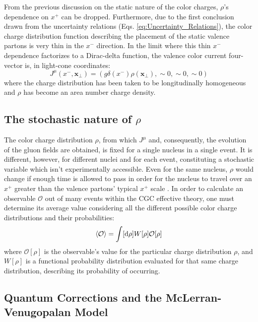 From the previous discussion on the static nature of the color charges, $\rho$'s dependence on $x^+$ can be dropped. Furthermore, due to the first conclusion drawn from the uncertainty relations (Eqs. \ref{eq:Uncertainty_Relations}), the color charge distribution function describing the placement of the static valence partons is very thin in the $x^-$ direction. In the limit where this thin $x^-$ dependence factorizes to a Dirac-delta function, the valence color current four-vector is, in light-cone coordinates:
\begin{equation}
	{J}^\mu (x^-,\mathbf{x}_\perp) = (g \delta (x^-) \rho (\mathbf{x}_\perp), \sim 0, \sim 0, \sim 0)
	\label{eq:+_Current}
\end{equation}
where the charge distribution has been taken to be longitudinally homogeneous and $\rho$ has become an area number charge density.

\subsection{The stochastic nature of $\rho$}
The color charge distribution $\rho$, from which $J^\mu$ and, consequently, the evolution of the gluon fields are obtained, is fixed for a single nucleus in a single event. It is different, however, for different nuclei and for each event, constituting a stochastic variable \cite{Gelis:2010nm} which isn't experimentally accessible.  Even for the same nucleus, $\rho$ would change if enough time is allowed to pass in order for the nucleus to travel over an $x^+$ greater than the valence partons' typical $x^+$ scale \cite{Gelis_Habilitation}. In order to calculate an observable $\mathcal{O}$ out of many events within the \gls{CGC} effective theory, one must determine its average value considering all the different possible color charge distributions and their probabilities: \cite{Gelis:2010nm}
\begin{equation}
	\left< \mathcal{O} \right> = \int [\mathop{}\!\mathrm{d} \rho] W[\rho] \mathcal{O}[\rho]
\end{equation}
where $\mathcal{O}[\rho]$ is the observable's value for the particular charge distribution $\rho$, and $W[\rho]$ is a functional probability distribution evaluated for that same charge distribution, describing its probability of occurring.

\subsection{Quantum Corrections and the McLerran-Venugopalan Model}

